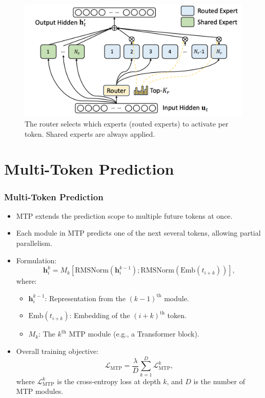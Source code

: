 \documentclass{beamer}
\begin{document}
\begin{frame}
    \begin{figure}[htbp]
        \centering
        \includegraphics[scale=0.28145]{attachments/deepseekmoe.png}
        \caption{The router selects which experts (routed experts) to activate per token. Shared experts are always applied.}
    \end{figure}
\end{frame}

\section{Multi-Token Prediction}

\begin{frame}
    \frametitle{Multi-Token Prediction}
    \begin{itemize}
        \item MTP extends the prediction scope to multiple future tokens at once.
        \item Each module in MTP predicts one of the next several tokens, allowing partial parallelism.
        \item Formulation:
              \begin{equation*}
                  \mathbf{h}_i^k=M_k[\text{RMSNorm}(\mathbf{h}_i^{k-1});\text{RMSNorm}(\text{Emb}(t_{i+k}))],
              \end{equation*}
              where:
              \begin{itemize}
                  \item $\mathbf{h}_i^{k-1}$: Representation from the $(k-1)^\text{th}$ module.
                  \item $\text{Emb}(t_{i+k})$: Embedding of the $(i+k)^\text{th}$ token.
                  \item $M_k$: The $k^\text{th}$ MTP module (e.g., a Transformer block).
              \end{itemize}
        \item Overall training objective:
              \begin{equation*}
                  \mathcal{L}_\text{MTP}=\frac{\lambda}{D}\sum_{k=1}^D\mathcal{L}_\text{MTP}^k,
              \end{equation*}
              where $\mathcal{L}_\text{MTP}^k$ is the cross-entropy loss at depth $k$, and $D$ is the number of MTP modules.
    \end{itemize}
\end{frame}
\end{document}
